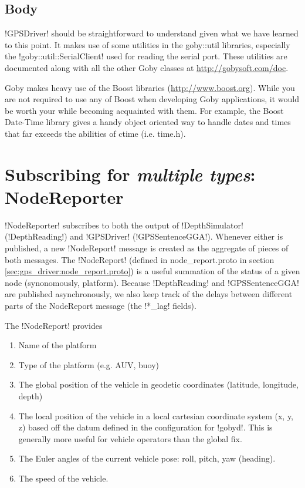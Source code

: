 \subsection{Body}
!GPSDriver! should be straightforward to understand given what we have learned to this point. It makes use of some utilities in the goby::util libraries, especially the !goby::util::SerialClient! used for reading the serial port. These utilities are documented along with all the other Goby classes at \url{http://gobysoft.com/doc}.

Goby makes heavy use of the Boost libraries (\url{http://www.boost.org}). While you are not required to use any of Boost when developing Goby applications, it would be worth your while becoming acquainted with them. For example, the Boost Date-Time library gives a handy object oriented way to handle dates and times that far exceeds the abilities of ctime (i.e. time.h).

\section{Subscribing for \textit{multiple types}: NodeReporter}

!NodeReporter! subscribes to both the output of !DepthSimulator! (!DepthReading!) and !GPSDriver! (!GPSSentenceGGA!). Whenever either is published, a new !NodeReport! message is created as the aggregate of pieces of both messages. The !NodeReport! (defined in node\_report.proto in section \ref{sec:gps_driver:node_report.proto}) is a useful summation of the status of a given node (synonomously, platform). Because !DepthReading! and !GPSSentenceGGA! are published asynchronously, we also keep track of the delays between different parts of the NodeReport message (the !*_lag! fields). 

The !NodeReport! provides
\begin{enumerate}
\item Name of the platform
\item Type of the platform (e.g. AUV, buoy)
\item The global position of the vehicle in geodetic coordinates (latitude, longitude, depth)
\item The local position of the vehicle in a local cartesian coordinate system (x, y, z) based off the datum defined in the configuration for !gobyd!. This is generally more useful for vehicle operators than the global fix.
\item The Euler angles of the current vehicle pose: roll, pitch, yaw (heading). 
\item The speed of the vehicle.
\end{enumerate}

